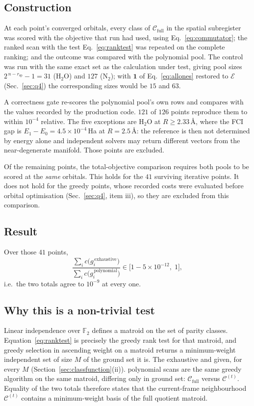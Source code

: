 \documentclass[11pt]{article}
\newcommand{\FF}{\mathbb F_2}
\newcommand{\Ecal}{\mathcal E}
\newcommand{\Ccal}{\mathcal C}
\newcommand{\rsp}{r_{\mathrm{sp}}}
\begin{document}
\subsection{Construction}
At each point's converged orbitals, every class of $\Ccal_{\mathrm{full}}$ in
the spatial subregister was scored with the objective that run had used, using
Eq.~\eqref{eq:commutator}; the ranked scan with the test
Eq.~\eqref{eq:ranktest} was repeated on the complete ranking; and the outcome
was compared with the polynomial pool. The control was run with the same exact
set as the calculation under test, giving pool sizes $2^{\,n-\rsp}-1=31$
($\mathrm{H_2O}$) and $127$ ($\mathrm{N_2}$); with $\mathbf 1$ of
Eq.~\eqref{eq:allones} restored to $\Ecal$ (Sec.~\ref{sec:q4}) the
corresponding sizes would be $15$ and $63$.

A correctness gate re-scores the polynomial pool's own rows and compares with
the values recorded by the production code. $121$ of $126$ points reproduce
them to within $10^{-4}$ relative. The five exceptions are $\mathrm{H_2O}$ at
$R\ge2.33$\,\AA, where the FCI gap is $E_1-E_0=4.5\times10^{-4}$\,Ha at
$R=2.5$\,\AA: the reference is then not determined by energy alone and
independent solvers may return different vectors from the near-degenerate
manifold. Those points are excluded.

Of the remaining points, the total-objective comparison requires both pools to
be scored at the \emph{same} orbitals. This holds for the $41$ surviving
iterative points. It does not hold for the greedy points, whose recorded costs
were evaluated before orbital optimisation (Sec.~\ref{sec:q4}, item iii), so
they are excluded from this comparison.

\subsection{Result}
Over those $41$ points,
\begin{equation}
\frac{\sum_i c\bigl(g_i^{\,\mathrm{exhaustive}}\bigr)}
     {\sum_i c\bigl(g_i^{\,\mathrm{polynomial}}\bigr)}
\in\bigl[1-5\times10^{-12},\;1\bigr],
\end{equation}
i.e.\ the two totals agree to $10^{-9}$ at every one.

\subsection{Why this is a non-trivial test}
\label{sec:matroid}
Linear independence over $\FF$ defines a matroid on the set of parity classes.
Equation~\eqref{eq:ranktest} is precisely the greedy rank test for that
matroid, and greedy selection in ascending weight on a matroid returns a
minimum-weight independent set of size $M$ of the ground set it is. The exhaustive and
given, for every $M$ (Section~\ref{sec:classfunction}(ii)). polynomial scans are the same greedy algorithm on the same matroid, differing
only in ground set: $\Ccal_{\mathrm{full}}$ versus $\Ccal^{(t)}$. Equality of
the two totals therefore states that the current-frame neighbourhood
$\Ccal^{(t)}$ contains a minimum-weight basis of the full quotient matroid.
\end{document}
